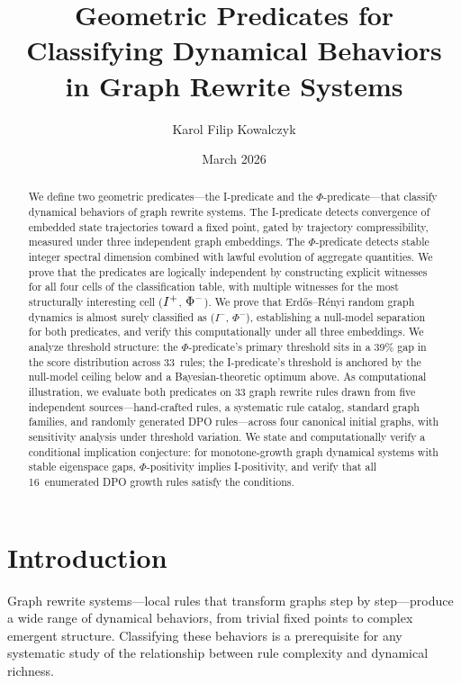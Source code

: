 \documentclass{../shared/primo}
\title{Geometric Predicates for Classifying Dynamical Behaviors\\in Graph Rewrite Systems}
\author{Karol Filip Kowalczyk}
\affiliation{AIRON Games}
\date{March 2026}
\begin{document}
\maketitle

\begin{abstract}
We define two geometric predicates---the I-predicate and the $\Phi$-predicate---that classify dynamical behaviors of graph rewrite systems. The I-predicate detects convergence of embedded state trajectories toward a fixed point, gated by trajectory compressibility, measured under three independent graph embeddings. The $\Phi$-predicate detects stable integer spectral dimension combined with lawful evolution of aggregate quantities. We prove that the predicates are logically independent by constructing explicit witnesses for all four cells of the classification table, with multiple witnesses for the most structurally interesting cell ($I\textsuperscript{+}$, $\Phi\textsuperscript{$-$}$). We prove that Erd\H{o}s--R\'enyi random graph dynamics is almost surely classified as ($I^-$, $\Phi^-$), establishing a null-model separation for both predicates, and verify this computationally under all three embeddings. We analyze threshold structure: the $\Phi$-predicate's primary threshold sits in a 39\% gap in the score distribution across 33~rules; the I-predicate's threshold is anchored by the null-model ceiling below and a Bayesian-theoretic optimum above. As computational illustration, we evaluate both predicates on 33 graph rewrite rules drawn from five independent sources---hand-crafted rules, a systematic rule catalog, standard graph families, and randomly generated DPO rules---across four canonical initial graphs, with sensitivity analysis under threshold variation. We state and computationally verify a conditional implication conjecture: for monotone-growth graph dynamical systems with stable eigenspace gaps, $\Phi$-positivity implies I-positivity, and verify that all 16~enumerated DPO growth rules satisfy the conditions.
\end{abstract}

\section{Introduction}
\label{sec:intro}

Graph rewrite systems---local rules that transform graphs step by step---produce a wide range of dynamical behaviors, from trivial fixed points to complex emergent structure. Classifying these behaviors is a prerequisite for any systematic study of the relationship between rule complexity and dynamical richness.
\end{document}
